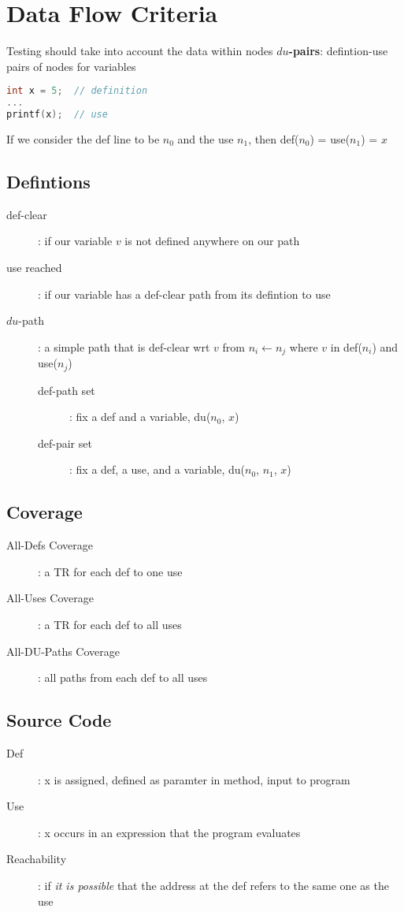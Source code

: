\documentclass[]{article}
\theoremstyle{definition}
\begin{document}
	\section{Data Flow Criteria}
		Testing should take into account the data within nodes
		\textbf{$du$-pairs}: defintion-use pairs of nodes for variables
		\begin{lstlisting}[language=C]
int x = 5;	// definition
...
printf(x);	// use
		\end{lstlisting}
		If we consider the def line to be $n_0$ and the use $n_1$, then def($n_0$) = use($n_1$) = ${x}$
		\subsection{Defintions}
			\begin{description}
				\item[def-clear]: if our variable $v$ is not defined anywhere on our path 
				\item[use reached]: if our variable has a def-clear path from its defintion to use
				\item[$du$-path]: a simple path that is def-clear wrt $v$ from $n_i \leftarrow n_j$ where $v$ in def($n_i$) and use($n_j$)
					\begin{description}
						\item[def-path set]: fix a def and a variable, du($n_0$, $x$)
						\item[def-pair set]: fix a def, a use, and a variable, du($n_0$, $n_1$, $x$)
					\end{description}
			\end{description}
		\subsection{Coverage}
			\begin{description}
				\item[All-Defs Coverage]: a TR for each def to one use
				\item[All-Uses Coverage]: a TR for each def to all uses
				\item[All-DU-Paths Coverage]: all paths from each def to all uses
			\end{description}
		\subsection{Source Code}
			\begin{description}
				\item[Def]: x is assigned, defined as paramter in method, input to program
				\item[Use]: x occurs in an expression that the program evaluates
				\item[Reachability]: if \textit{it is possible} that the address at the def refers to the same one as the use
			\end{description}
\end{document}
